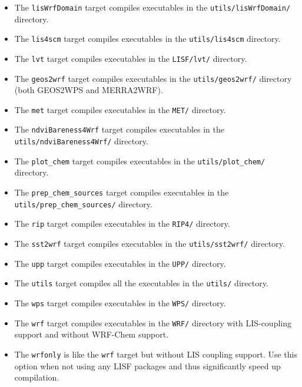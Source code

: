 \begin{itemize}
\begin{itemize}
  \item The \texttt{lisWrfDomain} target compiles executables in the 
    \texttt{utils/lisWrfDomain/} directory.
    
  \item The \texttt{lis4scm} target compiles executables in the 
  \texttt{utils/lis4scm} directory. 

  \item The \texttt{lvt} target compiles executables in the \texttt{LISF/lvt/} 
    directory.

  \item The \texttt{geos2wrf} target compiles executables in the 
    \texttt{utils/geos2wrf/} directory (both GEOS2WPS and MERRA2WRF).

  \item The \texttt{met} target compiles executables in the \texttt{MET/} 
    directory.

  \item The \texttt{ndviBareness4Wrf} target compiles executables in the\\
    \texttt{utils/ndviBareness4Wrf/} directory.

  \item The \texttt{plot\_chem} target compiles executables in the
    \texttt{utils/plot\_chem/} directory.

  \item The \texttt{prep\_chem\_sources} target compiles executables in the\\
    \texttt{utils/prep\_chem\_sources/} directory.

  \item The \texttt{rip} target compiles executables in the \texttt{RIP4/}
    directory.

  \item The \texttt{sst2wrf} target compiles executables in the
    \texttt{utils/sst2wrf/} directory.

  \item The \texttt{upp} target compiles executables in the \texttt{UPP/}
    directory.

  \item The \texttt{utils} target compiles all the executables in the \texttt{utils/}
    directory.

  \item The \texttt{wps} target compiles executables in the \texttt{WPS/}
    directory.

  \item The \texttt{wrf} target compiles executables in the \texttt{WRF/}
    directory with LIS-coupling support and without WRF-Chem support.
    
  \item The \texttt{wrfonly} is like the \texttt{wrf} target but without LIS coupling 
    support. Use this option when not using any LISF packages and thus significantly
    speed up compilation.


  \end{itemize}

\end{itemize}

